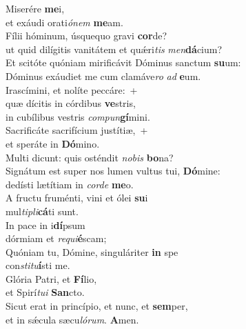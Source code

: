 \evenverse Miserére \textbf{me}i,~\*\\
\evenverse et exáudi orati\textit{ó}\textit{nem} \textbf{me}am.\\
\oddverse Fílii hóminum, úsquequo gravi \textbf{cor}de?~\*\\
\oddverse ut quid dilígitis vanitátem et quǽri\textit{tis} \textit{men}\textbf{dá}cium?\\
\evenverse Et scitóte quóniam mirificávit Dóminus sanctum \textbf{su}um:~\*\\
\evenverse Dóminus exáudiet me cum clamáve\textit{ro} \textit{ad} \textbf{e}um.\\
\oddverse Irascímini, et nolíte peccáre:~+\\
\oddverse  quæ dícitis in córdibus \textbf{ve}stris,~\*\\
\oddverse in cubílibus vestris \textit{com}\textit{pun}\textbf{gí}mini.\\
\evenverse Sacrificáte sacrifícium justítiæ,~+\\
\evenverse  et speráte in \textbf{Dó}mino.~\*\\
\evenverse Multi dicunt: quis osténdit \textit{no}\textit{bis} \textbf{bo}na?\\
\oddverse Signátum est super nos lumen vultus tui, \textbf{Dó}mine:~\*\\
\oddverse dedísti lætítiam in \textit{cor}\textit{de} \textbf{me}o.\\
\evenverse A fructu fruménti, vini et ólei \textbf{su}i~\*\\
\evenverse mul\textit{ti}\textit{pli}\textbf{cá}ti sunt.\\
\oddverse In pace in i\textbf{dí}psum~\*\\
\oddverse dórmiam et \textit{re}\textit{qui}\textbf{é}scam;\\
\evenverse Quóniam tu, Dómine, singuláriter \textbf{in} spe~\*\\
\evenverse con\textit{sti}\textit{tu}\textbf{í}sti me.\\
\oddverse Glória Patri, et \textbf{Fí}lio,~\*\\
\oddverse et Spirí\textit{tu}\textit{i} \textbf{San}cto.\\
\evenverse Sicut erat in princípio, et nunc, et \textbf{sem}per,~\*\\
\evenverse et in sǽcula sæcu\textit{ló}\textit{rum}. \textbf{A}men.\\
